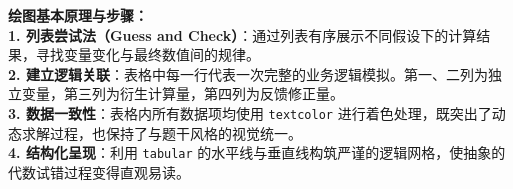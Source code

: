 \vspace{0.6cm}

{\small\color{blue!70!black}
\textbf{绘图基本原理与步骤：}\\
\textbf{1. 列表尝试法（Guess and Check）}：通过列表有序展示不同假设下的计算结果，寻找变量变化与最终数值间的规律。\\
\textbf{2. 建立逻辑关联}：表格中每一行代表一次完整的业务逻辑模拟。第一、二列为独立变量，第三列为衍生计算量，第四列为反馈修正量。\\
\textbf{3. 数据一致性}：表格内所有数据项均使用 \texttt{textcolor} 进行着色处理，既突出了动态求解过程，也保持了与题干风格的视觉统一。\\
\textbf{4. 结构化呈现}：利用 \texttt{tabular} 的水平线与垂直线构筑严谨的逻辑网格，使抽象的代数试错过程变得直观易读。
}



\newpage
